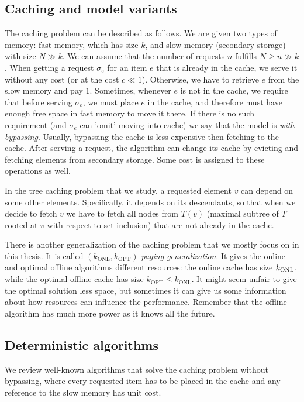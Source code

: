 \subsection{Caching and model variants}
The caching problem can be described as follows. We are given two types of memory: 
fast memory, which has size $k$, and slow memory (secondary storage) with size $N 
\gg k$. We can 
assume that the number of requests $n$ fulfills $N \geq n \gg k$. When getting a 
request $\sigma_{e}$ for an item $e$ that is already in the cache, we serve it 
without any cost (or at the cost $c \ll 1$). 
Otherwise, we have to retrieve $e$ from the slow memory and pay 
$1$. Sometimes, whenever $e$ is not in the cache, we require that before 
serving $\sigma_{e}$, we must place $e$ in the cache, and therefore must have 
enough free space in fast memory to move it there. If there is no such requirement 
(and $\sigma_{e}$ can 'omit' moving into cache) we say that the model is 
\textit{with bypassing}. Usually, bypassing the cache is less expensive then fetching to the cache. After serving 
a request, the algorithm can change its cache by evicting and fetching elements 
from secondary storage. Some cost is assigned to these operations as well.

In the tree caching problem that we study, a requested element $v$ can depend 
on some other elements. Specifically, it depends on its descendants, so that 
when we decide to fetch $v$ we have to fetch all nodes from $T(v)$ (maximal subtree of $T$ rooted at $v$ with respect to set inclusion)
that are not already in the cache.

There is another generalization of the caching problem that we mostly focus on in 
this thesis. It is called 
$(k_{\mathrm{ONL}}, k_{\mathrm{OPT}})$\textit{-paging generalization}. It gives 
the online and optimal offline algorithms different resources: the online cache has
size $k_{\mathrm{ONL}}$, while the optimal offline cache has size 
$k_{\mathrm{OPT}} \leq k_{\mathrm{ONL}}$. It might seem 
unfair to give the optimal solution less space, but sometimes it can give us 
some information about how resources can influence the performance. Remember 
that the offline algorithm has much more power as it knows all the future.

\subsection{Deterministic algorithms}
We review well-known algorithms that solve the caching problem without bypassing, 
where every requested item has to be placed in the cache and any reference to 
the slow memory has unit cost.
